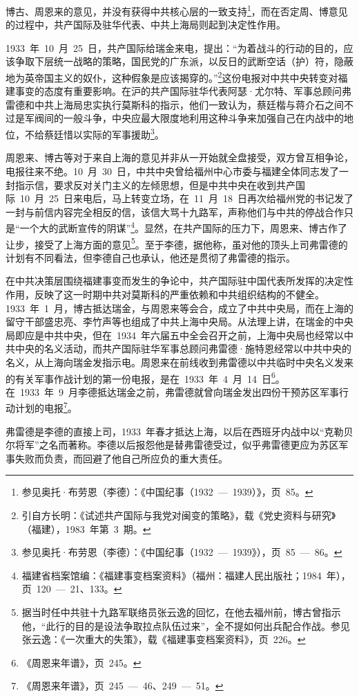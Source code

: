 博古、周恩来的意见，并没有获得中共核心层的一致支持\footnote{参见奥托·布劳恩（李德）：《中国纪事（1932~—~1939）》，页~85。}，而在否定周、博意见的过程中，共产国际及驻华代表、中共上海局则起到决定性作用。

1933~年~10~月~25~日，共产国际给瑞金来电，提出：“为着战斗的行动的目的，应该争取下层统一战略的策略，国民党的广东派，以反日的武断空话（护）符，隐蔽地为英帝国主义的奴仆，这种假象是应该揭穿的。”\footnote{引自方长明：《试述共产国际与我党对闽变的策略》，载《党史资料与研究》（福建），1983~年第~3~期。}这份电报对中共中央转变对福建事变的态度有重要影响。在沪的共产国际驻华代表阿瑟·尤尔特、军事总顾问弗雷德和中共上海局忠实执行莫斯科的指示，他们一致认为，蔡廷楷与蒋介石之间不过是军阀间的一般斗争，中央应最大限度地利用这种斗争来加强自己在内战中的地位，不给蔡廷惜以实际的军事援助\footnote{参见奥托·布劳恩（李德）：《中国纪事（1932~—~1939》），页~85~—~86。}。

周恩来、博古等对于来自上海的意见并非从一开始就全盘接受，双方曾互相争论，电报往来不绝。10~月~30~日，中共中央曾给福州中心市委与福建全体同志发了一封指示信，要求反对关门主义的左倾思想，但是中共中央在收到共产国际~10~月~25~日来电后，马上转变立场，在~11~月~18~日再次给福州党的书记发了一封与前信内容完全相反的信，该信大骂十九路军，声称他们与中共的停战合作只是“一个大的武断宣传的阴谋”\footnote{福建省档案馆编：《福建事变档案资料》（福州：福建人民出版社；1984~年），页~120~—~21、133。}。显然，在共产国际的压力下，周恩来、博古作了让步，接受了上海方面的意见\footnote{据当时任中共驻十九路军联络员张云逸的回忆，在他去福州前，博古曾指示他，“此行的目的是设法争取拉点队伍过来”，全不提如何出兵配合作战。参见张云逸：《一次重大的失策》，载《福建事变档案资料》，页~226。}。至于李德，据他称，虽对他的顶头上司弗雷德的计划有不同看法，但李德自己也承认，他还是贯彻了弗雷德的指示。

在中共决策层围绕福建事变而发生的争论中，共产国际驻中国代表所发挥的决定性作用，反映了这一时期中共对莫斯科的严重依赖和中共组织结构的不健全。1933~年~1~月，博古抵达瑞金，与周恩来等会合，成立了中共中央局，而在上海的留守干部盛忠亮、李竹声等也组成了中共上海中央局。从法理上讲，在瑞金的中央局即应是中共中央，但在~1934~年六届五中全会召开之前，上海中央局也经常以中共中央的名义活动，而共产国际驻华军事总顾问弗雷德·施特恩经常以中共中央的名义，从上海向瑞金发指示电。周恩来在前线收到弗雷德以中共临时中央名义发来的有关军事作战计划的第一份电报，是在~1933~年~4~月~14~日\footnote{《周恩来年谱》，页~245。}。在~1933~年~9~月李德抵达瑞金之前，弗雷德就曾向瑞金发出四份干预苏区军事行动计划的电报\footnote{《周恩来年谱》，页~245~—~46、249~—~51。}。

弗雷德是李德的直接上司，1933~年春才抵达上海，以后在西班牙内战中以“克勒贝尔将军”之名而著称。李德以后报怨他是替弗雷德受过，似乎弗雷德更应为苏区军事失败而负责，而回避了他自己所应负的重大责任。


